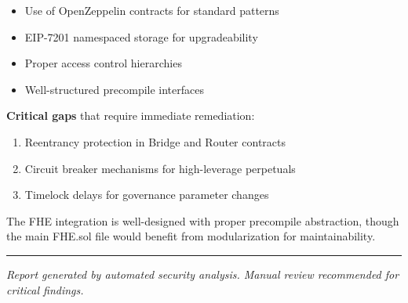 \documentclass[
]{article}
\providecommand{\tightlist}{%
  \setlength{\itemsep}{0pt}\setlength{\parskip}{0pt}}
\begin{document}
\begin{itemize}
\tightlist
\item
  Use of OpenZeppelin contracts for standard patterns
\item
  EIP-7201 namespaced storage for upgradeability
\item
  Proper access control hierarchies
\item
  Well-structured precompile interfaces
\end{itemize}

\textbf{Critical gaps} that require immediate remediation:

\begin{enumerate}
\def\labelenumi{\arabic{enumi}.}
\tightlist
\item
  Reentrancy protection in Bridge and Router contracts
\item
  Circuit breaker mechanisms for high-leverage perpetuals
\item
  Timelock delays for governance parameter changes
\end{enumerate}

The FHE integration is well-designed with proper precompile abstraction,
though the main FHE.sol file would benefit from modularization for
maintainability.

\begin{center}\rule{0.5\linewidth}{0.5pt}\end{center}

\emph{Report generated by automated security analysis. Manual review
recommended for critical findings.}
\end{document}
